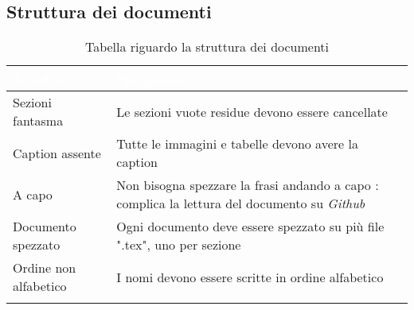 \subsection{Struttura dei documenti}
{
    \setlength{\freewidth}{\dimexpr\textwidth-10\tabcolsep}
    \renewcommand{\arraystretch}{1.5}
    \centering
    \setlength{\aboverulesep}{0pt}
    \setlength{\belowrulesep}{0pt}
    \begin{longtable}{C{.5\freewidth} C{.5\freewidth}}
       \toprule
    \textcolor{white}{\textbf{Aspetto}}&
    \textcolor{white}{\textbf{Spiegazione}} \\
    \toprule
    \endhead
    Sezioni fantasma & Le sezioni vuote residue devono essere cancellate \\
    Caption assente &  Tutte le immagini e tabelle devono avere la caption \\
    A capo & Non bisogna spezzare la frasi andando a capo : complica la lettura del documento su \textit{Github}\\
    Documento spezzato & Ogni documento deve essere spezzato su più file ".tex", uno per sezione \\
    Ordine non alfabetico & I nomi devono essere scritte in ordine alfabetico \\
    
    \bottomrule
    \caption{Tabella riguardo la struttura dei documenti}
\end{longtable}    
    
}
